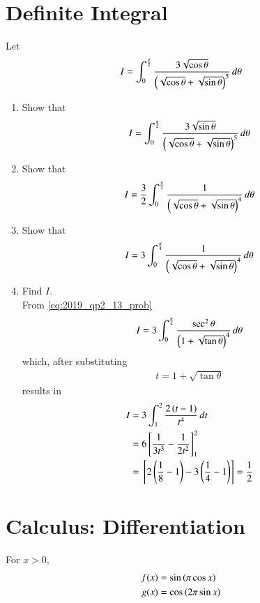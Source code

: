 \documentclass[journal,12pt,twocolumn]{IEEEtran}
\renewcommand\thesection{\arabic{section}}
\begin{document}
\section{Definite Integral}
Let
\begin{align}
I = \int_{0}^{\frac{\pi}{2}}\frac{3\sqrt{\cos\theta}}{\left(\sqrt{\cos\theta}+\sqrt{\sin\theta}\right)^5}\,d\theta
\end{align}
%
\begin{enumerate}[label=\thesection.\arabic*
,ref=\thesection.\theenumi]
\item Show that 
\begin{align}
I = \int_{0}^{\frac{\pi}{2}}\frac{3\sqrt{\sin\theta}}{\left(\sqrt{\cos\theta}+\sqrt{\sin\theta}\right)^5}\,d\theta
\end{align}
\item Show that 
\begin{align}
I = \frac{3}{2}\int_{0}^{\frac{\pi}{2}}\frac{1}{\left(\sqrt{\cos\theta}+\sqrt{\sin\theta}\right)^4}\,d\theta
\end{align}
\item Show that 
\begin{align}
\label{eq:2019_qp2_13_prob}
I = 3\int_{0}^{\frac{\pi}{4}}\frac{1}{\left(\sqrt{\cos\theta}+\sqrt{\sin\theta}\right)^4}\,d\theta
\end{align}
\item Find $I$.
\\
\solution From \eqref{eq:2019_qp2_13_prob}
%
\begin{align}
\label{eq:2019_qp2_13_tan}
I = 3\int_{0}^{\frac{\pi}{4}}\frac{\sec^2\theta}{\left(1+\sqrt{\tan\theta}\right)^4}\,d\theta
\end{align}
%
which, after substituting 
\begin{align}
\label{eq:2019_qp2_13_t}
t= 1 + \sqrt{\tan\theta}
\end{align}
results in
\begin{align}
\label{eq:2019_qp2_13_tan}
I &= 3\int_{1}^{2}\frac{2\left(t-1\right)}{t^4}\,dt
\nonumber \\
&=6{}\left[\frac{1}{3t^3}-\frac{1}{2t^2}\right]_{1}^{2}
\nonumber \\
&={}\left[2\left(\frac{1}{8}-1\right)-3\left(\frac{1}{4}-1\right)\right]= \frac{1}{2}
\end{align}
\end{enumerate}
\section{Calculus: Differentiation}
For $x > 0$, 
\begin{align}
f(x) &= \sin\left(\pi \cos x\right)
\\
g(x) &= \cos\left(2\pi \sin x\right)
\end{align}
%
\end{document}
